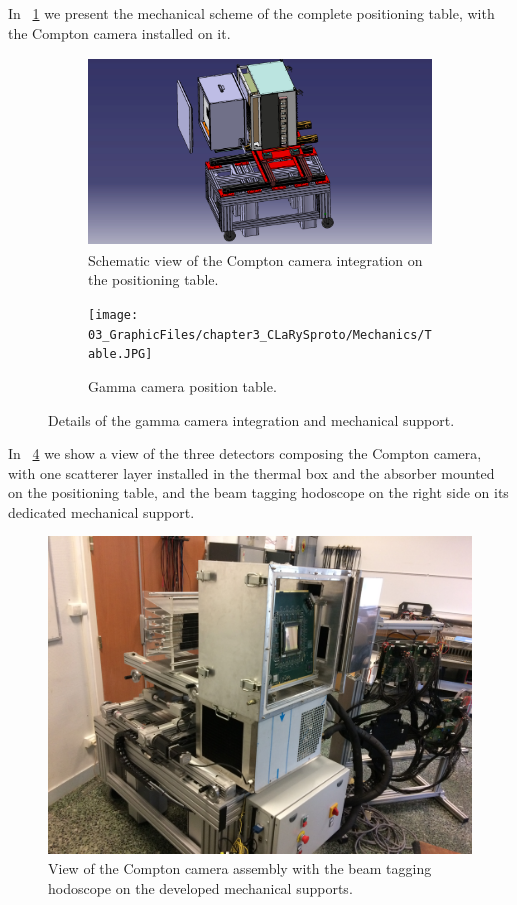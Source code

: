 In \figurename~\ref{chap3::fig::schemeTable} we present the mechanical scheme of the complete positioning table, with the Compton camera installed on it.

\begin{figure}
\begin{subfigure}[t]{.5\textwidth}
\centering
\includegraphics[width=1\textwidth, trim= {1cm 0 1cm 0}, clip = true, height=5cm]{03_GraphicFiles/chapter3_CLaRySproto/Mechanics/TableCameraSchemeBlue.jpg}
\caption{Schematic view of the Compton camera integration on the positioning table.}
\label{chap3::fig::schemeTable}
\end{subfigure}
\begin{subfigure}[t]{.5\textwidth}
\centering
\texttt{[image: 03\_GraphicFiles/chapter3\_CLaRySproto/Mechanics/Table.JPG]}
\caption{Gamma camera position table.}
\label{chap3::fig::pictureTable}
\end{subfigure}
\caption{Details of the gamma camera integration and mechanical support.}
\label{chap3::fig::CameraIntegration}
\end{figure}

In \figurename~\ref{chap3::fig::cameraAllPicture} we show a view of the three detectors composing the Compton camera, with one scatterer layer installed in the thermal box and the absorber mounted on the positioning table, and the beam tagging hodoscope on the right side on its dedicated mechanical support.

\begin{figure}[!htbp]
\centering
\includegraphics[width=\textwidth]{03_GraphicFiles/chapter3_CLaRySproto/camera_complete.JPG}
\caption{View of the Compton camera assembly with the beam tagging hodoscope on the developed mechanical supports.}
\label{chap3::fig::cameraAllPicture}
\end{figure}


